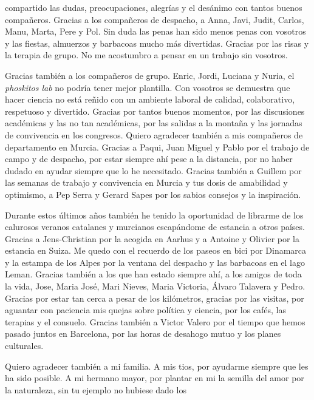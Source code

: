 \documentclass[11pt,twoside]{reedthesis}
\begin{document}
\begin{acknowledgements}
    compartido las dudas, preocupaciones, alegrías y el desánimo con tantos
    buenos compañeros. Gracias a los compañeros de despacho, a Anna, Javi,
    Judit, Carlos, Manu, Marta, Pere y Pol. Sin duda las penas han sido
    menos penas con vosotros y las fiestas, almuerzos y barbacoas mucho más
    divertidas. Gracias por las risas y la terapia de grupo. No me
    acostumbro a pensar en un trabajo sin vosotros.\par
    Gracias también a los compañeros de grupo. Enric, Jordi, Luciana y
    Nuria, el \emph{phoskitos lab} no podría tener mejor plantilla. Con
    vosotros se demuestra que hacer ciencia no está reñido con un ambiente
    laboral de calidad, colaborativo, respetuoso y divertido. Gracias por
    tantos buenos momentos, por las discusiones académicas y las no tan
    académicas, por las salidas a la montaña y las jornadas de convivencia
    en los congresos. Quiero agradecer también a mis compañeros de
    departamento en Murcia. Gracias a Paqui, Juan Miguel y Pablo por el
    trabajo de campo y de despacho, por estar siempre ahí pese a la
    distancia, por no haber dudado en ayudar siempre que lo he necesitado.
    Gracias también a Guillem por las semanas de trabajo y convivencia en
    Murcia y tus dosis de amabilidad y optimismo, a Pep Serra y Gerard Sapes
    por los sabios consejos y la inspiración.\par
    Durante estos últimos años también he tenido la oportunidad de librarme
    de los calurosos veranos catalanes y murcianos escapándome de estancia a
    otros países. Gracias a Jens-Christian por la acogida en Aarhus y a
    Antoine y Olivier por la estancia en Suiza. Me quedo con el recuerdo de
    los paseos en bici por Dinamarca y la estampa de los Alpes por la
    ventana del despacho y las barbacoas en el lago Leman. Gracias también a
    los que han estado siempre ahí, a los amigos de toda la vida, Jose,
    Maria José, Mari Nieves, Maria Victoria, Álvaro Talavera y Pedro.
    Gracias por estar tan cerca a pesar de los kilómetros, gracias por las
    visitas, por aguantar con paciencia mis quejas sobre política y ciencia,
    por los cafés, las terapias y el consuelo. Gracias también a Victor
    Valero por el tiempo que hemos pasado juntos en Barcelona, por las horas
    de desahogo mutuo y los planes culturales.\par
    Quiero agradecer también a mi familia. A mis tios, por ayudarme siempre
    que les ha sido posible. A mi hermano mayor, por plantar en mi la
    semilla del amor por la naturaleza, sin tu ejemplo no hubiese dado los

\end{acknowledgements}
\end{document}
